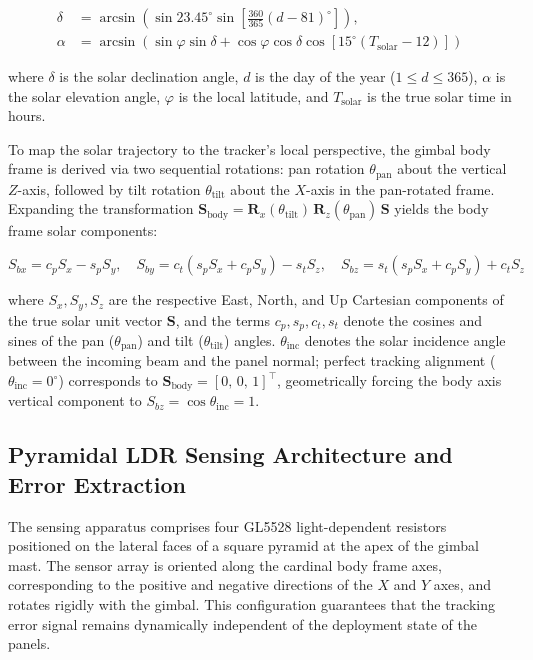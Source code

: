 \documentclass[preprint,3p,12pt]{elsarticle}
\newcommand{\degr}{^{\circ}}
\newcommand{\Svec}{\mathbf{S}}
\newcommand{\thetapan}{\theta_{\mathrm{pan}}}
\newcommand{\thetatilt}{\theta_{\mathrm{tilt}}}
\newcommand{\thetainc}{\theta_{\mathrm{inc}}}
\begin{document}
\begin{align}
    \delta &= \arcsin\!\left(\sin 23.45\degr \sin\!\left[\frac{360}{365}(d - 81)\degr\right]\right), \nonumber \\
    \alpha &= \arcsin\!\left(\sin\varphi\sin\delta + \cos\varphi\cos\delta\cos[15\degr(T_{\mathrm{solar}} - 12)]\right)
    \label{eq:ephemeris}
\end{align}

where $\delta$ is the solar declination angle, $d$ is the day of the year ($1 \leq d \leq 365$), $\alpha$ is the solar elevation angle, $\varphi$ is the local latitude, and $T_{\mathrm{solar}}$ is the true solar time in hours.

To map the solar trajectory to the tracker's local perspective, the gimbal body frame is derived via two sequential rotations: pan rotation $\thetapan$ about the vertical $Z$-axis, followed by tilt rotation $\thetatilt$ about the $X$-axis in the pan-rotated frame. Expanding the transformation $\Svec_{\mathrm{body}} = \mathbf{R}_x(\thetatilt)\,\mathbf{R}_z(\thetapan)\,\Svec$ yields the body frame solar components:

\begin{equation}
    S_{bx} = c_p S_x - s_p S_y, \quad
    S_{by} = c_t(s_p S_x + c_p S_y) - s_t S_z, \quad
    S_{bz} = s_t(s_p S_x + c_p S_y) + c_t S_z
    \label{eq:body_transform}
\end{equation}

where $S_x, S_y, S_z$ are the respective East, North, and Up Cartesian components of the true solar unit vector $\Svec$, and the terms $c_p, s_p, c_t, s_t$ denote the cosines and sines of the pan ($\thetapan$) and tilt ($\thetatilt$) angles. $\thetainc$ denotes the solar incidence angle between the incoming beam and the panel normal; perfect tracking alignment ($\thetainc = 0\degr$) corresponds to $\Svec_{\mathrm{body}} = [0,\,0,\,1]^\top$, geometrically forcing the body axis vertical component to $S_{bz} = \cos\thetainc = 1$.

\subsection{Pyramidal LDR Sensing Architecture and Error Extraction}
\label{sec:ldr_model}

The sensing apparatus comprises four GL5528 light-dependent resistors positioned on the lateral faces of a square pyramid at the apex of the gimbal mast. The sensor array is oriented along the cardinal body frame axes, corresponding to the positive and negative directions of the $X$ and $Y$ axes, and rotates rigidly with the gimbal. This configuration guarantees that the tracking error signal remains dynamically independent of the deployment state of the panels.
\end{document}
